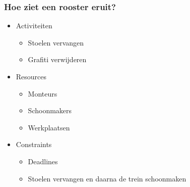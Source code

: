 \begin{frame}\frametitle{Hoe ziet een rooster eruit?}
    \begin{itemize}
        \item Activiteiten
        \begin{itemize}
            \item Stoelen vervangen
            \item Grafiti verwijderen      
        \end{itemize}
        \item Resources
        \begin{itemize}
            \item Monteurs
            \item Schoonmakers
            \item Werkplaatsen
        \end{itemize}
        \item Constraints
        \begin{itemize}
            \item Deadlines
            \item Stoelen vervangen en daarna de trein schoonmaken      
        \end{itemize}
    \end{itemize}
\end{frame}
